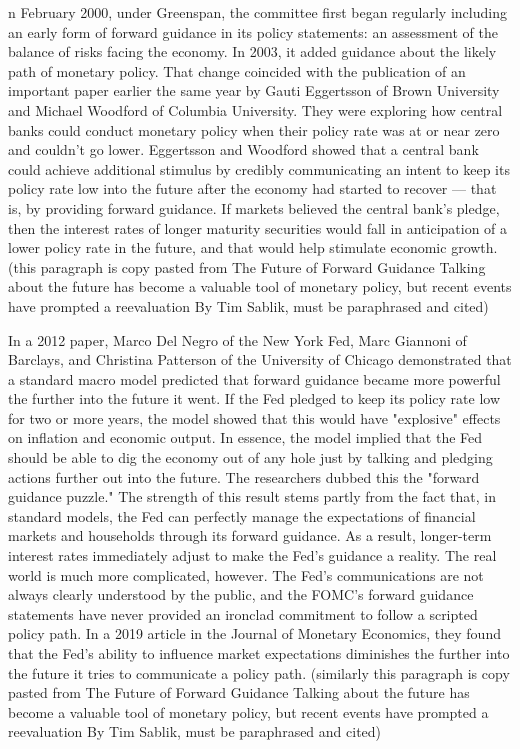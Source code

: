 \documentclass[11pt]{article}
\begin{document}
n February 2000, under Greenspan, the committee first began regularly including an early form of forward guidance in its policy statements: an assessment of the balance of risks facing the economy. In 2003, it added guidance about the likely path of monetary policy. That change coincided with the publication of an important paper earlier the same year by Gauti Eggertsson of Brown University and Michael Woodford of Columbia University. They were exploring how central banks could conduct monetary policy when their policy rate was at or near zero and couldn't go lower. Eggertsson and Woodford showed that a central bank could achieve additional stimulus by credibly communicating an intent to keep its policy rate low into the future after the economy had started to recover — that is, by providing forward guidance. If markets believed the central bank's pledge, then the interest rates of longer maturity securities would fall in anticipation of a lower policy rate in the future, and that would help stimulate economic growth. (this paragraph is copy pasted from The Future of Forward Guidance Talking about the future has become a valuable tool of monetary policy, but recent events have prompted a reevaluation By Tim Sablik, must be paraphrased and cited)

In a 2012 paper, Marco Del Negro of the New York Fed, Marc Giannoni of Barclays, and Christina Patterson of the University of Chicago demonstrated that a standard macro model predicted that forward guidance became more powerful the further into the future it went. If the Fed pledged to keep its policy rate low for two or more years, the model showed that this would have "explosive" effects on inflation and economic output. In essence, the model implied that the Fed should be able to dig the economy out of any hole just by talking and pledging actions further out into the future. The researchers dubbed this the "forward guidance puzzle."
The strength of this result stems partly from the fact that, in standard models, the Fed can perfectly manage the expectations of financial markets and households through its forward guidance. As a result, longer-term interest rates immediately adjust to make the Fed's guidance a reality. The real world is much more complicated, however. The Fed's communications are not always clearly understood by the public, and the FOMC's forward guidance statements have never provided an ironclad commitment to follow a scripted policy path. In a 2019 article in the Journal of Monetary Economics, they found that the Fed's ability to influence market expectations diminishes the further into the future it tries to communicate a policy path. (similarly this paragraph is copy pasted from The Future of Forward Guidance Talking about the future has become a valuable tool of monetary policy, but recent events have prompted a reevaluation By Tim Sablik, must be paraphrased and cited)
\end{document}
